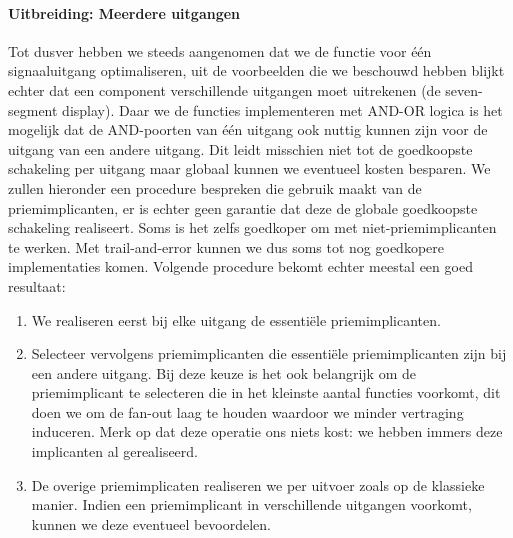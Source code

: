 \paragraph{Uitbreiding: Meerdere uitgangen}
Tot dusver hebben we steeds aangenomen dat we de functie voor \'e\'en signaaluitgang optimaliseren, uit de voorbeelden die we beschouwd hebben blijkt echter dat een component verschillende uitgangen moet uitrekenen (de seven-segment display). Daar we de functies implementeren met AND-OR logica is het mogelijk dat de AND-poorten van \'e\'en uitgang ook nuttig kunnen zijn voor de uitgang van een andere uitgang. Dit leidt misschien niet tot de goedkoopste schakeling per uitgang maar globaal kunnen we eventueel kosten besparen. We zullen hieronder een procedure bespreken die gebruik maakt van de priemimplicanten, er is echter geen garantie dat deze de globale goedkoopste schakeling realiseert. Soms is het zelfs goedkoper om met niet-priemimplicanten te werken. Met trail-and-error kunnen we dus soms tot nog goedkopere implementaties komen. Volgende procedure bekomt echter meestal een goed resultaat:
\begin{enumerate}
 \item We realiseren eerst bij elke uitgang de essenti\"ele priemimplicanten.
 \item Selecteer vervolgens priemimplicanten die essenti\"ele priemimplicanten zijn bij een andere uitgang. Bij deze keuze is het ook belangrijk om de priemimplicant te selecteren die in het kleinste aantal functies voorkomt, dit doen we om de fan-out laag te houden waardoor we minder vertraging induceren. Merk op dat deze operatie ons niets kost: we hebben immers deze implicanten al gerealiseerd.
 \item De overige priemimplicaten realiseren we per uitvoer zoals op de klassieke manier. Indien een priemimplicant in verschillende uitgangen voorkomt, kunnen we deze eventueel bevoordelen.
\end{enumerate}
